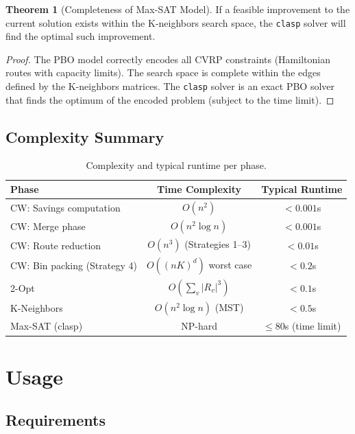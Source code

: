 \documentclass[12pt,a4paper]{article}
\theoremstyle{definition}
\newtheorem{theorem}{Theorem}[section]
\begin{document}
\begin{theorem}[Completeness of Max-SAT Model]
If a feasible improvement to the current solution exists within the K-neighbors search space, the \texttt{clasp} solver will find the optimal such improvement.
\end{theorem}

\begin{proof}
The PBO model correctly encodes all CVRP constraints (Hamiltonian routes with capacity limits). The search space is complete within the edges defined by the K-neighbors matrices. The \texttt{clasp} solver is an exact PBO solver that finds the optimum of the encoded problem (subject to the time limit).
\end{proof}

\subsection{Complexity Summary}

\begin{table}[H]
\centering
\begin{tabular}{lcc}
\toprule
\textbf{Phase} & \textbf{Time Complexity} & \textbf{Typical Runtime} \\
\midrule
CW: Savings computation & $O(n^2)$ & $< 0.001$s \\
CW: Merge phase & $O(n^2 \log n)$ & $< 0.001$s \\
CW: Route reduction & $O(n^3)$ (Strategies 1--3) & $< 0.01$s \\
CW: Bin packing (Strategy 4) & $O((nK)^d)$ worst case & $< 0.2$s \\
2-Opt & $O(\sum_v |R_v|^3)$ & $< 0.1$s \\
K-Neighbors & $O(n^2 \log n)$ (MST) & $< 0.5$s \\
Max-SAT (clasp) & NP-hard & $\leq 80$s (time limit) \\
\bottomrule
\end{tabular}
\caption{Complexity and typical runtime per phase.}
\end{table}

\section{Usage}

\subsection{Requirements}
\end{document}
